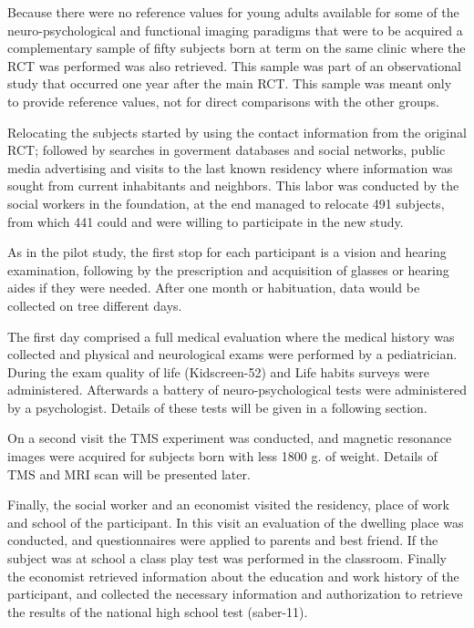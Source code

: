 Because there were no reference values for young adults available for some of the neuro-psychological and functional imaging paradigms that were to be acquired a complementary sample of fifty subjects born at term on the same clinic where the RCT was performed was also retrieved. This sample was part of an observational study that occurred one year after the main RCT. This sample was meant only to provide reference values, not for direct comparisons with the other groups.

Relocating the subjects started by using the contact information from the original RCT; followed by searches in goverment databases and social networks, public media advertising and visits to the last known residency where information was sought from current inhabitants and neighbors. This labor was conducted by the social workers in the foundation, at the end managed to relocate 491 subjects, from which 441 could and were willing to participate in the new study. 


 
As in the pilot study, the first stop for each participant is a vision and hearing examination, following by the prescription and acquisition of glasses or hearing aides if they were needed. After one month or habituation, data would be collected on tree different days.

The first day comprised a full medical evaluation where the medical history was collected and physical and neurological exams were performed by a pediatrician. During the exam quality of life (Kidscreen-52) and Life habits surveys were administered. Afterwards a battery of neuro-psychological tests were administered by a psychologist. Details of these tests will be given in a following section. 

On a second visit the TMS experiment was conducted, and magnetic resonance images were acquired for subjects born with less 1800 g. of weight. Details of TMS and MRI scan will be presented later.

Finally, the social worker and an economist visited the residency, place of work and school of the participant. In this visit an evaluation of the dwelling place was conducted, and questionnaires were applied to parents and best friend. If the subject was at school a class play test was performed in the classroom. Finally the economist retrieved information about the education and work history of the participant, and collected the necessary information and authorization to retrieve the results of the national high school test (saber-11).

